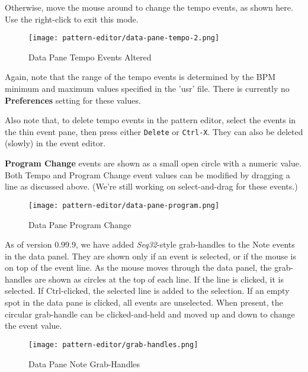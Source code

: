   Otherwise, move the mouse around to change
   the tempo events, as shown here.
   Use the right-click to exit this mode.

\begin{figure}[H]
   \centering 
   \texttt{[image: pattern-editor/data-pane-tempo-2.png]}
   \caption{Data Pane Tempo Events Altered}
   \label{fig:pattern_editor_data_pane_tempo_events_altered}
\end{figure}

   Again, note that the range of the tempo events is
   determined by the BPM minimum and maximum values
   specified in the 'usr' file.
   There is currently no \textbf{Preferences}
   setting for these values.  

   Also note that, to delete tempo events in the pattern editor,
   select the events in the thin event pane, then press
   either \texttt{Delete} or \texttt{Ctrl-X}.
   They can also be deleted (slowly) in the event editor.

   \textbf{Program Change}
   events are shown as a small open circle with a numeric value.
   Both Tempo and Program Change event values can be modified by dragging a
   line as discussed above. (We're still working on select-and-drag for
   these events.)

\begin{figure}[H]
   \centering 
   \texttt{[image: pattern-editor/data-pane-program.png]}
   \caption{Data Pane Program Change}
   \label{fig:pattern_editor_data_pane_program_change}
\end{figure}

   As of version 0.99.9, we have added \textsl{Seq32}-style grab-handles
   to the Note events in the data panel.
   They are shown only if an event is selected, or if the mouse
   is on top of the event line.
   As the mouse moves through the data panel, the grab-handles are shown
   as circles at the top of each line.
   If the line is clicked, it is selected.
   If Ctrl-clicked, the selected line is added to the selection.
   If an empty spot in the data pane is clicked, all events are
   unselected.
   When present, the circular grab-handle can be clicked-and-held
   and moved up and down to change the event value.

\begin{figure}[H]
   \centering 
   \texttt{[image: pattern-editor/grab-handles.png]}
   \caption{Data Pane Note Grab-Handles}
   \label{fig:pattern_editor_data_pane_note_grab_handles}
\end{figure}

